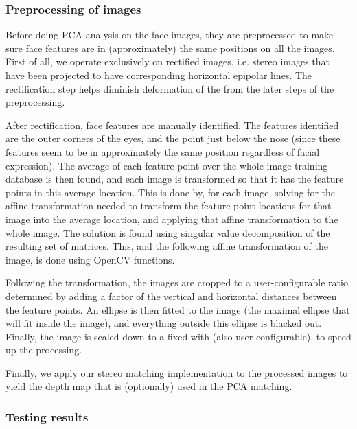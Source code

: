

\subsubsection{Preprocessing of images}
Before doing PCA analysis on the face images, they are preprocessed to make sure
face features are in (approximately) the same positions on all the images. First
of all, we operate exclusively on rectified images, i.e. stereo images that have
been projected to have corresponding horizontal epipolar lines. The
rectification step helps diminish deformation of the from the later steps of the
preprocessing.

After rectification, face features are manually identified. The features
identified are the outer corners of the eyes, and the point just below the nose
(since these features seem to be in approximately the same position regardless
of facial expression). The average of each feature point over the whole image
training database is then found, and each image is transformed so that it has
the feature points in this average location. This is done by, for each image,
solving for the affine transformation needed to transform the feature point
locations for that image into the average location, and applying that affine
transformation to the whole image. The solution is found using singular value
decomposition of the resulting set of matrices. This, and the following affine
transformation of the image, is done using OpenCV functions.

Following the transformation, the images are cropped to a user-configurable
ratio determined by adding a factor of the vertical and horizontal distances
between the feature points. An ellipse is then fitted to the image (the maximal
ellipse that will fit inside the image), and everything outside this ellipse is
blacked out. Finally, the image is scaled down to a fixed with (also
user-configurable), to speed up the processing.

Finally, we apply our stereo matching implementation to the processed images to
yield the depth map that is (optionally) used in the PCA matching.

\subsubsection{Testing results}
